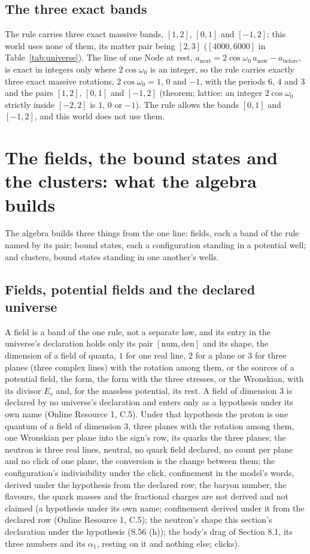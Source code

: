 \documentclass[pdflatex,sn-mathphys-num]{sn-jnl}
\newcommand{\num}{\mathrm{num}}
\newcommand{\den}{\mathrm{den}}
\newcommand{\anow}{a_{\mathrm{now}}}
\newcommand{\abefore}{a_{\mathrm{before}}}
\newcommand{\anext}{a_{\mathrm{next}}}
\theoremstyle{thmstyleone}
\theoremstyle{thmstyletwo}
\begin{document}
\subsection{The three exact bands}\label{sec:exact}

The rule carries three exact massive bands, $[1, 2]$, $[0, 1]$ and $[-1, 2]$; this world uses none of them, its matter pair being $[2, 3]$ ($[4000, 6000]$ in Table~\ref{tab:universe}). The line of one Node at rest, $\anext = 2\cos\omega_0\,\anow - \abefore$, is exact in integers only where $2\cos\omega_0$ is an integer, so the rule carries exactly three exact massive rotations, $2\cos\omega_0 = 1$, $0$ and $-1$, with the periods $6$, $4$ and $3$ and the pairs $[1, 2]$, $[0, 1]$ and $[-1, 2]$ (theorem; lattice: an integer $2\cos\omega_0$ strictly inside $[-2, 2]$ is $1$, $0$ or $-1$). The rule allows the bands $[0, 1]$ and $[-1, 2]$, and this world does not use them.
\section{The fields, the bound states and the clusters: what the algebra builds}\label{sec:builds}

The algebra builds three things from the one line: fields, each a band of the rule named by its pair; bound states, each a configuration standing in a potential well; and clusters, bound states standing in one another's wells.

\subsection{Fields, potential fields and the declared universe}\label{sec:families}

A field is a band of the one rule, not a separate law, and its entry in the universe's declaration holds only its pair $[\num, \den]$ and its shape, the dimension of a field of quanta, $1$ for one real line, $2$ for a plane or $3$ for three planes (three complex lines) with the rotation among them, or the sources of a potential field, the form, the form with the three stresses, or the Wronskian, with its divisor $E_s$ and, for the massless potential, its rest. A field of dimension $3$ is declared by no universe's declaration and enters only as a hypothesis under its own name (Online Resource 1, C.5). Under that hypothesis the proton is one quantum of a field of dimension $3$, three planes with the rotation among them, one Wronskian per plane into the sign's row, its quarks the three planes; the neutron is three real lines, neutral, no quark field declared, no count per plane and no click of one plane, the conversion is the change between them; the configuration's indivisibility under the click, confinement in the model's words, derived under the hypothesis from the declared row; the baryon number, the flavours, the quark masses and the fractional charges are not derived and not claimed (a hypothesis under its own name; confinement derived under it from the declared row (Online Resource 1, C.5); the neutron's shape this section's declaration under the hypothesis (S.56 (h)); the body's drag of Section 8.1, its three numbers and its $\alpha_1$, resting on it and nothing else; clicks). 
\end{document}
